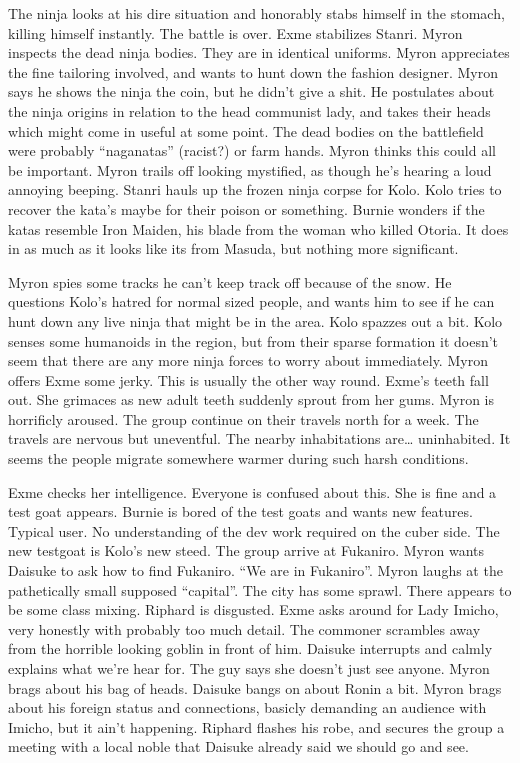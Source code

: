 \begin{multicols}{2}
The ninja looks at his dire situation and honorably stabs himself in the stomach, killing himself instantly. The battle is over. Exme stabilizes Stanri. Myron inspects the dead ninja bodies. They are in identical uniforms. Myron appreciates the fine tailoring involved, and wants to hunt down the fashion designer. Myron says he shows the ninja the coin, but he didn’t give a shit. He postulates about the ninja origins in relation to the head communist lady, and takes their heads which might come in useful at some point. The dead bodies on the battlefield were probably “naganatas” (racist?) or farm hands. Myron thinks this could all be important. Myron trails off looking mystified, as though he’s hearing a loud annoying beeping. Stanri hauls up the frozen ninja corpse for Kolo. Kolo tries to recover the kata’s maybe for their poison or something. Burnie wonders if the katas resemble Iron Maiden, his blade from the woman who killed Otoria. It does in as much as it looks like its from Masuda, but nothing more significant.\medskip

Myron spies some tracks he can't keep track off because of the snow. He questions Kolo’s hatred for normal sized people, and wants him to see if he can hunt down any live ninja that might be in the area. Kolo spazzes out a bit. Kolo senses some humanoids in the region, but from their sparse formation it doesn’t seem that there are any more ninja forces to worry about immediately. Myron offers Exme some jerky. This is usually the other way round. Exme’s teeth fall out. She grimaces as new adult teeth suddenly sprout from her gums. Myron is horrificly aroused. The group continue on their travels north for a week. The travels are nervous but uneventful. The nearby inhabitations are… uninhabited. It seems the people migrate somewhere warmer during such harsh conditions.\medskip

Exme checks her intelligence. Everyone is confused about this. She is fine and a test goat appears. Burnie is bored of the test goats and wants new features. Typical user. No understanding of the dev work required on the cuber side. The new testgoat is Kolo’s new steed. The group arrive at Fukaniro. Myron wants Daisuke to ask how to find Fukaniro. “We are in Fukaniro”. Myron laughs at the pathetically small supposed “capital”. The city has some sprawl. There appears to be some class mixing. Riphard is disgusted. Exme asks around for Lady Imicho, very honestly with probably too much detail. The commoner scrambles away from the horrible looking goblin in front of him. Daisuke interrupts and calmly explains what we’re hear for. The guy says she doesn’t just see anyone. Myron brags about his bag of heads. Daisuke bangs on about Ronin a bit. Myron brags about his foreign status and connections, basicly demanding an audience with Imicho, but it ain’t happening. Riphard flashes his robe, and secures the group a meeting with a local noble that Daisuke already said we should go and see.\medskip


\end{multicols}
